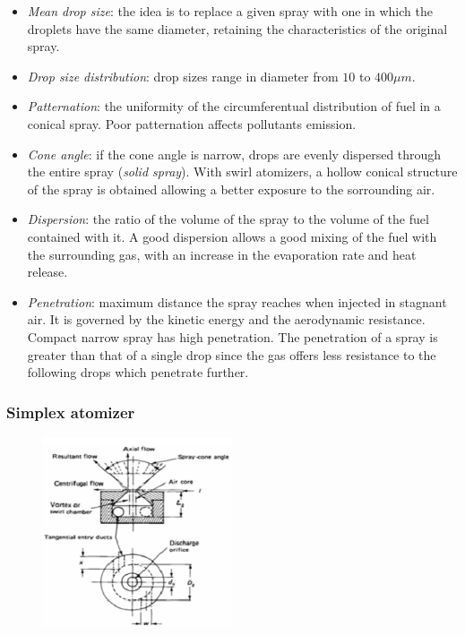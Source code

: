 \documentclass[12pt]{article}
\begin{document}
\begin{itemize}
    \item \textit{Mean drop size}: the idea is to replace a given spray with one in which the droplets have the same diameter, retaining the characteristics of the original spray.
    \item \textit{Drop size distribution}: drop sizes range in diameter from $10$ to $400 \mu m$.
    \item  \textit{Patternation}: the uniformity of the circumferentual distribution of fuel in a conical spray. Poor patternation affects pollutants emission.
    \item \textit{Cone angle}: if the cone angle is narrow, drops are evenly dispersed through the entire spray (\textit{solid spray}). With swirl atomizers, a hollow conical structure of the spray is obtained allowing a better exposure to the sorrounding air.
    \item \textit{Dispersion}: the ratio of the volume of the spray to the volume of the fuel contained with it. A good dispersion allows a good mixing of the fuel with the surrounding gas, with an increase in the evaporation rate and heat release.
    \item \textit{Penetration}: maximum distance the spray reaches when injected in stagnant air. It is governed by the kinetic energy and the aerodynamic resistance. Compact narrow spray has high penetration. The penetration of a spray is greater than that of a single drop since the gas offers less resistance to the following drops which penetrate further.
\end{itemize}

\subsubsection{Simplex atomizer}

\begin{figure}[!ht]
\centering
\includegraphics[width=0.5\textwidth]{figures/simplex.png}
\end{figure}
\end{document}
